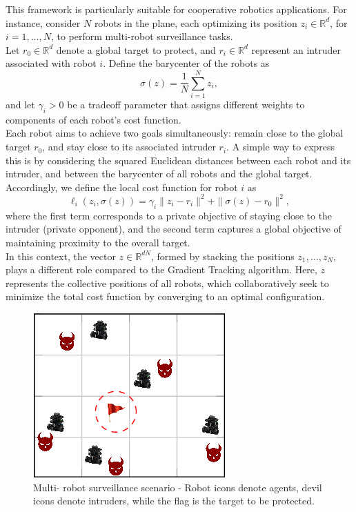 \noindent This framework is particularly suitable for cooperative robotics applications. For instance, consider \( N \) robots in the plane, each optimizing its position \( z_i \in \mathbb{R}^d \), for \( i = 1, \ldots, N \), to perform multi-robot surveillance tasks. \\
Let \( r_0 \in \mathbb{R}^d \) denote a global target to protect, and \( r_i \in \mathbb{R}^d \) represent an intruder associated with robot \( i \). Define the barycenter of the robots as
\[
\sigma(z) = \frac{1}{N} \sum_{i=1}^N z_i,
\]
and let \( \gamma_i > 0 \) be a tradeoff parameter that assigns different weights to components of each robot's cost function. \\
Each robot aims to achieve two goals simultaneously: remain close to the global target \( r_0 \), and  stay close to its associated intruder \( r_i \). A simple way to express this is by considering the squared Euclidean distances between each robot and its intruder, and between the barycenter of all robots and the global target. \\
Accordingly, we define the local cost function for robot \( i \) as
\[
\ell_i(z_i, \sigma(z)) = \gamma_i \| z_i - r_i \|^2 + \| \sigma(z) - r_0 \|^2,
\]
where the first term corresponds to a private objective of staying close to the intruder (private opponent), and the second term captures a global objective of maintaining proximity to the overall target. \\
In this context, the vector \( z \in \mathbb{R}^{dN} \), formed by stacking the positions \( z_1, \ldots, z_N \), plays a different role compared to the Gradient Tracking algorithm. Here, \( z \) represents the collective positions of all robots, which collaboratively seek to minimize the total cost function by converging to an optimal configuration.

\begin{figure}[h!]
    \centering
    \includegraphics[width=0.35\linewidth]{figs/aggregative_optimization.png}
    \caption{Multi- robot surveillance scenario - Robot icons denote agents, devil icons denote intruders, while the flag is the target to be protected. \cite{Carnevale2021DistributedOA}}
\end{figure}

